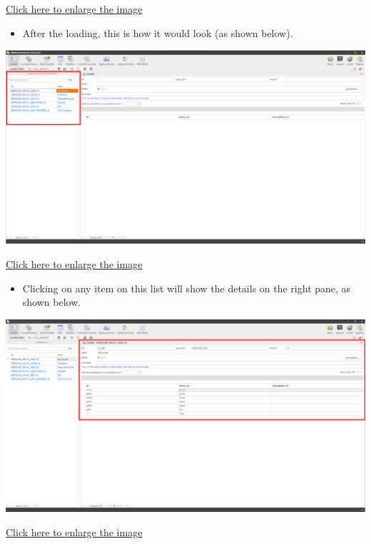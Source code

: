 \documentclass[
]{book}
\providecommand{\tightlist}{%
  \setlength{\itemsep}{0pt}\setlength{\parskip}{0pt}}
\theoremstyle{definition}
\theoremstyle{definition}
\theoremstyle{definition}
\theoremstyle{definition}
\theoremstyle{remark}
\begin{document}
\href{images/image094.png}{Click here to enlarge the image}

\begin{itemize}
\tightlist
\item
  After the loading, this is how it would look (as shown below).
\end{itemize}

\begin{center}\includegraphics[width=1\linewidth]{./images/image096} \end{center}

\href{images/image096.png}{Click here to enlarge the image}

\begin{itemize}
\tightlist
\item
  Clicking on any item on this list will show the details on the right pane, as shown below.
\end{itemize}

\begin{center}\includegraphics[width=1\linewidth]{./images/image098} \end{center}

\href{images/image098.png}{Click here to enlarge the image}
\end{document}
